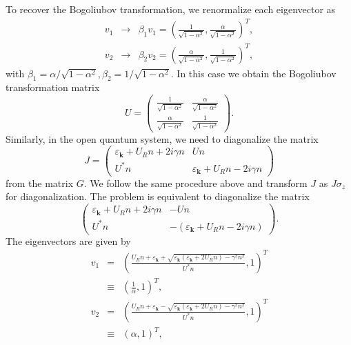 \documentclass[aps,superscriptaddress,notitlepage,longbibliography]{revtex4-1}
\begin{document}
To recover the Bogoliubov transformation, we renormalize each eigenvector
as 
\begin{eqnarray}
v_{1} & \rightarrow & \beta_{1}v_{1}=\left(\frac{1}{\sqrt{1-\alpha^{2}}},\frac{\alpha}{\sqrt{1-\alpha^{2}}}\right)^{T},\\
v_{2} & \rightarrow & \beta_{2}v_{2}=\left(\frac{\alpha}{\sqrt{1-\alpha^{2}}},\frac{1}{\sqrt{1-\alpha^{2}}}\right)^{T},
\end{eqnarray}
with $\beta_{1}=\alpha/\sqrt{1-\alpha^{2}},\beta_{2}=1/\sqrt{1-\alpha^{2}}$.
In this case we obtain the Bogoliubov transformation matrix \citep{Ueda2010}
\begin{equation}
U=\left(\begin{array}{cc}
\frac{1}{\sqrt{1-\alpha^{2}}} & \frac{\alpha}{\sqrt{1-\alpha^{2}}}\\
\frac{\alpha}{\sqrt{1-\alpha^{2}}} & \frac{1}{\sqrt{1-\alpha^{2}}}
\end{array}\right).\label{Bogoliubov}
\end{equation}
Similarly, in the open quantum system, we need to diagonalize the
matrix 
\begin{equation}
J=\left(\begin{array}{cc}
\varepsilon_{\bm{k}}+U_{R}n+2i\gamma n & Un\\
U^{\ast}n & \varepsilon_{\bm{k}}+U_{R}n-2i\gamma n
\end{array}\right)
\end{equation}
from the matrix $G$. We follow the same procedure above and transform
$J$ as $J\sigma_{z}$ for diagonalization. The problem is equivalent
to diagonalize the matrix 
\begin{equation}
\left(\begin{array}{cc}
\varepsilon_{\bm{k}}+U_{R}n+2i\gamma n & -Un\\
U^{\ast}n & -(\varepsilon_{\bm{k}}+U_{R}n-2i\gamma n)
\end{array}\right).
\end{equation}
The eigenvectors are given by 
\begin{eqnarray}
v_{1} & = & \left(\frac{U_{R}n+\varepsilon_{\bm{k}}+\sqrt{\varepsilon_{\bm{k}}(\varepsilon_{\bm{k}}+2U_{R}n)-\gamma^{2}n^{2}}}{U^{\ast}n},1\right)^{T}\nonumber \\
 & \equiv & \left(\frac{1}{\bar{\alpha}},1\right)^{T},\\
v_{2} & = & \left(\frac{U_{R}n+\varepsilon_{\bm{k}}-\sqrt{\varepsilon_{\bm{k}}(\varepsilon_{\bm{k}}+2U_{R}n)-\gamma^{2}n^{2}}}{U^{\ast}n},1\right)^{T}\nonumber \\
 & \equiv & (\alpha,1)^{T},
\end{eqnarray}
\end{document}

